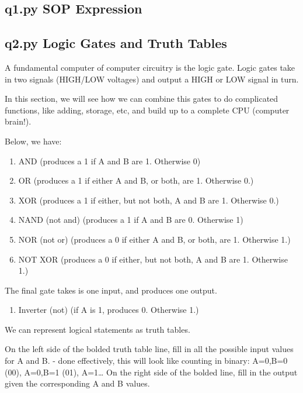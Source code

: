 \documentclass{article}
\providecommand{\tightlist}{%
  \setlength{\itemsep}{0pt}\setlength{\parskip}{0pt}}
\begin{document}
\subsection{q1.py SOP Expression}\label{q1.py-sop-expression}

\subsection{q2.py Logic Gates and Truth
Tables}\label{q2.py-logic-gates-and-truth-tables}

A fundamental computer of computer circuitry is the logic gate. Logic
gates take in two signals (HIGH/LOW voltages) and output a HIGH or LOW
signal in turn.

In this section, we will see how we can combine this gates to do
complicated functions, like adding, storage, etc, and build up to a
complete CPU (computer brain!).

Below, we have:

\begin{enumerate}
\def\labelenumi{\arabic{enumi}.}
\tightlist
\item
  AND (produces a 1 if A and B are 1. Otherwise 0)
\item
  OR (produces a 1 if either A and B, or both, are 1. Otherwise 0.)
\item
  XOR (produces a 1 if either, but not both, A and B are 1. Otherwise
  0.)
\item
  NAND (not and) (produces a 1 if A and B are 0. Otherwise 1)
\item
  NOR (not or) (produces a 0 if either A and B, or both, are 1.
  Otherwise 1.)
\item
  NOT XOR (produces a 0 if either, but not both, A and B are 1.
  Otherwise 1.)
\end{enumerate}

The final gate takes is one input, and produces one output.

\begin{enumerate}
\def\labelenumi{\arabic{enumi}.}
\setcounter{enumi}{6}
\tightlist
\item
  Inverter (not) (if A is 1, produces 0. Otherwise 1.)
\end{enumerate}

We can represent logical statements as truth tables.

On the left side of the bolded truth table line, fill in all the
possible input values for A and B. - done effectively, this will look
like counting in binary: A=0,B=0 (00), A=0,B=1 (01), A=1\ldots{} On the
right side of the bolded line, fill in the output given the
corresponding A and B values.
\end{document}
